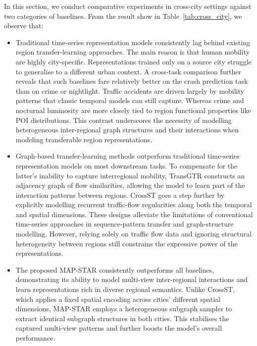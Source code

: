 In this section, we conduct comparative experiments in cross-city settings against two categories of baselines. From the result show in Table~\ref{tab:cross_city}, we observe that:
\begin{itemize}

    \item Traditional time-series representation models consistently lag behind existing region transfer-learning approaches. The main reason is that human mobility are highly city-specific. Representations trained only on a source city struggle to generalise to a different urban context. A cross-task comparison further reveals that such baselines fare relatively better on the crash prediction task than on crime or nightlight. Traffic accidents are driven largely by mobility patterns that classic temporal models can still capture. Whereas crime and nocturnal luminosity are more closely tied to region functional properties like POI distributions. This contrast underscores the necessity of modelling heterogeneous inter-regional graph structures and their interactions when modeling transferable region representations.
    
    \item Graph-based transfer-learning methods outperform traditional time-series representation models on most downstream tasks. To compensate for the latter’s inability to capture interregional mobility, TransGTR constructs an adjacency graph of flow similarities, allowing the model to learn part of the interaction patterns between regions. CrossST goes a step further by explicitly modelling recurrent traffic-flow regularities along both the temporal and spatial dimensions. These designs alleviate the limitations of conventional time-series approaches in sequence-pattern transfer and graph-structure modelling. However, relying solely on traffic flow data and ignoring structural heterogeneity between regions still constrains the expressive power of the representations.

    \item The proposed MAP-STAR consistently outperforms all baselines, demonstrating its ability to model multi-view inter-regional interactions and learn representations rich in diverse regional semantics. Unlike CrossST, which applies a fixed spatial encoding across cities' different spatial dimensions, MAP-STAR employs a heterogeneous subgraph sampler to extract identical subgraph structures in both cities. This stabilises the captured multi-view patterns and further boosts the model’s overall performance.
\end{itemize}

